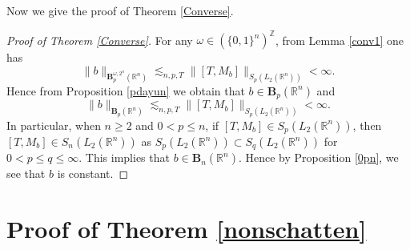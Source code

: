 \documentclass[oneside,english,a4wide]{amsart}
\numberwithin{equation}{section}
\numberwithin{figure}{section}
\theoremstyle{plain}
\theoremstyle{plain}
\theoremstyle{definition}
\theoremstyle{plain}
\theoremstyle{remark}
\newtheorem{rem}[thm]{\protect\remarkname}
\theoremstyle{definition}
\theoremstyle{remark}
\theoremstyle{definition}
\providecommand{\remarkname}{Remark}
\newcommand{\M}{{\mathcal M}}
\newcommand{\8}{\infty}
\begin{document}
	 
Now we give the proof of Theorem \ref{Converse}.
\begin{proof}[Proof of Theorem \ref{Converse}]
 For any $\omega\in(\{0,1\}^n)^\mathbb{Z}$, from Lemma \ref{conv1} one has
	\begin{equation*}
		\|b\|_{\pmb{B}_p^{\omega,2^n}(\mathbb{R}^n)}\lesssim_{n,p,T} \|[T,M_{b}]\|_{S_p(L_2(\mathbb{R}^n))}<\infty.
	\end{equation*}
	Hence from Proposition \ref{pdayun} we obtain that $b\in \pmb{B}_p(\mathbb{R}^n)$ and
	\begin{equation*}
		\|b\|_{\pmb{B}_p(\mathbb{R}^n)}\lesssim_{n,p,T} \|[T,M_{b}]\|_{S_p(L_2(\mathbb{R}^n))}<\infty.
	\end{equation*}
	In particular, when $n\geq 2$ and $0<p\le n$, if $[T,M_{b}]\in S_p(L_2(\mathbb{R}^n))$, then $[T,M_{b}]\in S_n(L_2(\mathbb{R}^n))$ as $S_p(L_2(\mathbb{R}^n))\subset S_q(L_2(\mathbb{R}^n))$ for $0<p\leq q\leq \8$. This implies that $b\in \pmb{B}_n(\mathbb{R}^n)$. Hence by Proposition \ref{0pn}, we see that $b$ is constant.	
\end{proof}	




\bigskip

\section{Proof of Theorem \ref{nonschatten}}\label{noncomschattenconv}
\end{document}
